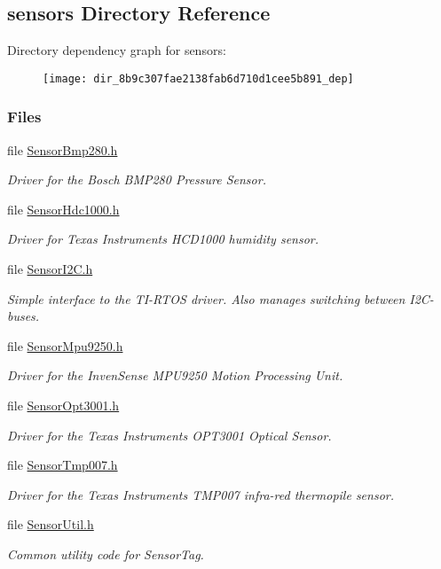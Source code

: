 \subsection{sensors Directory Reference}
\label{dir_8b9c307fae2138fab6d710d1cee5b891}
Directory dependency graph for sensors\+:
\nopagebreak
\begin{figure}[H]
\begin{center}
\leavevmode
\texttt{[image: dir\_8b9c307fae2138fab6d710d1cee5b891\_dep]}
\end{center}
\end{figure}
\subsubsection*{Files}
\begin{DoxyCompactItemize}
\item 
file \hyperlink{_sensor_bmp280_8h}{Sensor\+Bmp280.\+h}
\begin{DoxyCompactList}\small\item\em Driver for the Bosch B\+M\+P280 Pressure Sensor. \end{DoxyCompactList}\item 
file \hyperlink{_sensor_hdc1000_8h}{Sensor\+Hdc1000.\+h}
\begin{DoxyCompactList}\small\item\em Driver for Texas Instruments H\+C\+D1000 humidity sensor. \end{DoxyCompactList}\item 
file \hyperlink{_sensor_i2_c_8h}{Sensor\+I2\+C.\+h}
\begin{DoxyCompactList}\small\item\em Simple interface to the T\+I-\/\+R\+T\+O\+S driver. Also manages switching between I2\+C-\/buses. \end{DoxyCompactList}\item 
file \hyperlink{_sensor_mpu9250_8h}{Sensor\+Mpu9250.\+h}
\begin{DoxyCompactList}\small\item\em Driver for the Inven\+Sense M\+P\+U9250 Motion Processing Unit. \end{DoxyCompactList}\item 
file \hyperlink{_sensor_opt3001_8h}{Sensor\+Opt3001.\+h}
\begin{DoxyCompactList}\small\item\em Driver for the Texas Instruments O\+P\+T3001 Optical Sensor. \end{DoxyCompactList}\item 
file \hyperlink{_sensor_tmp007_8h}{Sensor\+Tmp007.\+h}
\begin{DoxyCompactList}\small\item\em Driver for the Texas Instruments T\+M\+P007 infra-\/red thermopile sensor. \end{DoxyCompactList}\item 
file \hyperlink{_sensor_util_8h}{Sensor\+Util.\+h}
\begin{DoxyCompactList}\small\item\em Common utility code for Sensor\+Tag. \end{DoxyCompactList}\end{DoxyCompactItemize}
